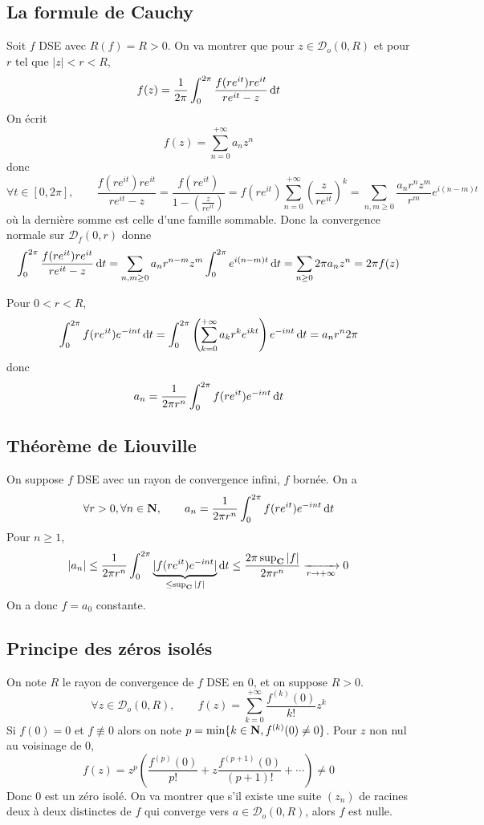 \subsection{La formule de Cauchy}

Soit $f$ DSE avec $R(f)=R>0$. On va montrer que pour $z \in \mathcal{D}_o(0, R)$ et pour $r$ tel que $|z|<r<R$, \[
    f(z)=\frac{1}{2\pi}\int_{0}^{2\pi} \frac{f(re^{it})re^{it}}{re^{it}-z}\mathop{}\!\mathrm d t
\]
On écrit \[
    f(z)=\sum_{n=0}^{+\infty} a_n z^n
\]
donc\[
    \forall t\in [0, 2\pi],  \qquad \frac{f(re^{it})re^{it}}{re^{it}-z}=\frac{f(re^{it})}{1- \left( \frac{z}{re^{it}} \right) } = f(re^{it}) \sum_{n=0}^{+\infty} \left( \frac{z}{re^{it}} \right)^k=\sum_{n,m\geq 0} \frac{a_nr^nz^m}{r^m}e^{i(n-m)t}
\]
où la dernière somme est celle d'une famille sommable. Donc la convergence normale sur $\mathcal{D}_f(0,r)$ donne \[
    \int_{0}^{2\pi} \frac{f(re^{it})re^{it}}{re^{it}-z}\mathop{}\!\mathrm d t= \sum_{n,m\geq 0}a_nr^{n-m}z^m \int_{0}^{2\pi} e^{i(n-m)t}\mathop{}\!\mathrm d t=\sum_{n\geq 0}2\pi a_nz^n=2\pi f(z)
\]

\begin{rem}
    Pour $0<r<R$, \[
        \int_{0}^{2\pi } f(re^{it})e^{-i nt}\mathop{}\!\mathrm d t = \int_{0}^{2\pi } \left( \sum_{k=0}^{+\infty} a_kr^ke^{ikt} \right) e^{-int}\mathop{}\!\mathrm d t=a_nr^{n}2\pi 
    \]
    donc \[
        a_n=\frac{1}{2\pi r^n}\int_{0}^{2\pi } f(re^{it})e^{-int}\mathop{}\!\mathrm d t 
    \]
\end{rem}

\subsection{Théorème de Liouville}

On suppose $f$ DSE avec un rayon de convergence infini, $f$ bornée. On a \[
    \forall r>0, \forall n\in\mathbf N, \qquad a_n=\frac{1}{2\pi r^n}\int_{0}^{2\pi }f(re^{it}) e^{-int}\mathop{}\!\mathrm d t
\]
Pour $n\geq 1$, \[
    |a_n|\leq \frac{1}{2\pi r^n}\int_{0}^{2\pi } \underbrace{|f(re^{it})e^{-int}|}_{\leq \sup_{\mathbf C}|f|}\mathop{}\!\mathrm d t\leq \frac{2\pi \sup_{\mathbf C}|f|}{2\pi r^n} \xrightarrow[r\to+\infty]{}0
\]
On a donc $f=a_0$ constante.


\subsection{Principe des zéros isolés}

On note $R$ le rayon de convergence de $f$ DSE en $0$, et on suppose $R>0$. \[
    \forall z \in \mathcal{D}_o(0,R),\qquad f(z)=\sum_{k=0}^{+\infty} \frac{f^{(k)}(0)}{k!}z^k
\]
Si $f(0)=0$ et $f\not\equiv 0$ alors on note $p=\min \{k\in\mathbf N, f^{(k)}(0)\neq 0\}$. Pour $z$ non nul au voisinage de $0$, \[
    f(z)=z^p \left( \frac{f^{(p)}(0)}{p!}+ z \frac{f^{(p+1)}(0)}{(p+1)!}+\cdots \right) \neq 0
\]
Donc $0$ est un zéro isolé. On va montrer que s'il existe une suite $(z_n)$ de racines deux à deux distinctes de $f$ qui converge vers $a\in\mathcal D_o(0,R)$, alors $f$ est nulle.

